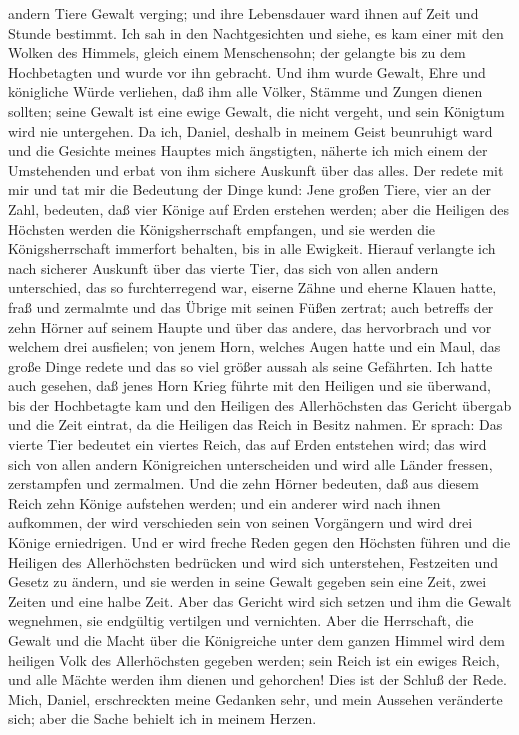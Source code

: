 andern Tiere Gewalt verging; und ihre Lebensdauer ward ihnen auf Zeit
und Stunde bestimmt.  Ich sah in den Nachtgesichten und
siehe, es kam einer mit den Wolken des Himmels, gleich einem
Menschensohn; der gelangte bis zu dem Hochbetagten und wurde vor ihn
gebracht.  Und ihm wurde Gewalt, Ehre und königliche
Würde verliehen, daß ihm alle Völker, Stämme und Zungen dienen sollten;
seine Gewalt ist eine ewige Gewalt, die nicht vergeht, und sein Königtum
wird nie untergehen.  Da ich, Daniel, deshalb in meinem
Geist beunruhigt ward und die Gesichte meines Hauptes mich ängstigten,
 näherte ich mich einem der Umstehenden und erbat von ihm
sichere Auskunft über das alles. Der redete mit mir und tat mir die
Bedeutung der Dinge kund:  Jene großen Tiere, vier an der
Zahl, bedeuten, daß vier Könige auf Erden erstehen werden;
 aber die Heiligen des Höchsten werden die
Königsherrschaft empfangen, und sie werden die Königsherrschaft
immerfort behalten, bis in alle Ewigkeit.  Hierauf
verlangte ich nach sicherer Auskunft über das vierte Tier, das sich von
allen andern unterschied, das so furchterregend war, eiserne Zähne und
eherne Klauen hatte, fraß und zermalmte und das Übrige mit seinen Füßen
zertrat;  auch betreffs der zehn Hörner auf seinem Haupte
und über das andere, das hervorbrach und vor welchem drei ausfielen; von
jenem Horn, welches Augen hatte und ein Maul, das große Dinge redete und
das so viel größer aussah als seine Gefährten.  Ich hatte
auch gesehen, daß jenes Horn Krieg führte mit den Heiligen und sie
überwand,  bis der Hochbetagte kam und den Heiligen des
Allerhöchsten das Gericht übergab und die Zeit eintrat, da die Heiligen
das Reich in Besitz nahmen.  Er sprach: Das vierte Tier
bedeutet ein viertes Reich, das auf Erden entstehen wird; das wird sich
von allen andern Königreichen unterscheiden und wird alle Länder
fressen, zerstampfen und zermalmen.  Und die zehn Hörner
bedeuten, daß aus diesem Reich zehn Könige aufstehen werden; und ein
anderer wird nach ihnen aufkommen, der wird verschieden sein von seinen
Vorgängern und wird drei Könige erniedrigen.  Und er wird
freche Reden gegen den Höchsten führen und die Heiligen des
Allerhöchsten bedrücken und wird sich unterstehen, Festzeiten und Gesetz
zu ändern, und sie werden in seine Gewalt gegeben sein eine Zeit, zwei
Zeiten und eine halbe Zeit.  Aber das Gericht wird sich
setzen und ihm die Gewalt wegnehmen, sie endgültig vertilgen und
vernichten.  Aber die Herrschaft, die Gewalt und die
Macht über die Königreiche unter dem ganzen Himmel wird dem heiligen
Volk des Allerhöchsten gegeben werden; sein Reich ist ein ewiges Reich,
und alle Mächte werden ihm dienen und gehorchen!  Dies
ist der Schluß der Rede. Mich, Daniel, erschreckten meine Gedanken sehr,
und mein Aussehen veränderte sich; aber die Sache behielt ich in meinem
Herzen.

